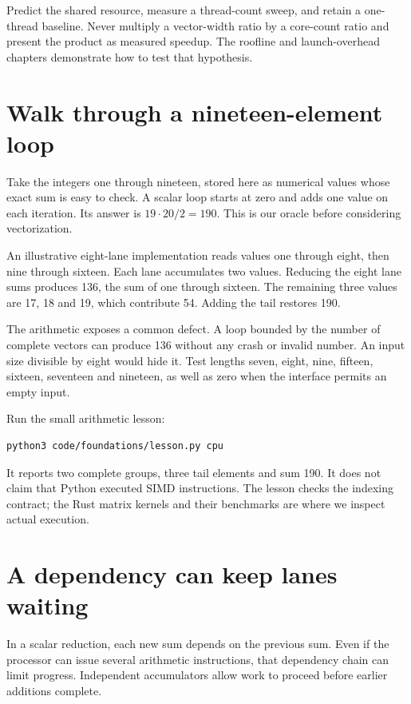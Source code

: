 Predict the shared resource, measure a thread-count sweep, and retain a
one-thread baseline. Never multiply a vector-width ratio by a core-count
ratio and present the product as measured speedup. The roofline and
launch-overhead chapters demonstrate how to test that hypothesis.

\section{Walk through a nineteen-element loop}
Take the integers one through nineteen, stored here as numerical values
whose exact sum is easy to check. A scalar loop starts at zero and adds
one value on each iteration. Its answer is
$19\cdot20/2=190$. This is our oracle before considering vectorization.

An illustrative eight-lane implementation reads values one through eight,
then nine through sixteen. Each lane accumulates two values. Reducing
the eight lane sums produces 136, the sum of one through sixteen.
The remaining three values are 17, 18 and 19, which contribute 54.
Adding the tail restores 190.


The arithmetic exposes a common defect. A loop bounded by the number of
complete vectors can produce 136 without any crash or invalid number.
An input size divisible by eight would hide it. Test lengths seven,
eight, nine, fifteen, sixteen, seventeen and nineteen, as well as zero
when the interface permits an empty input.

Run the small arithmetic lesson:
\begin{verbatim}
python3 code/foundations/lesson.py cpu
\end{verbatim}
It reports two complete groups, three tail elements and sum 190.
It does not claim that Python executed SIMD instructions. The lesson
checks the indexing contract; the Rust matrix kernels and their
benchmarks are where we inspect actual execution.

\section{A dependency can keep lanes waiting}
In a scalar reduction, each new sum depends on the previous sum.
Even if the processor can issue several arithmetic instructions,
that dependency chain can limit progress. Independent accumulators
allow work to proceed before earlier additions complete.

